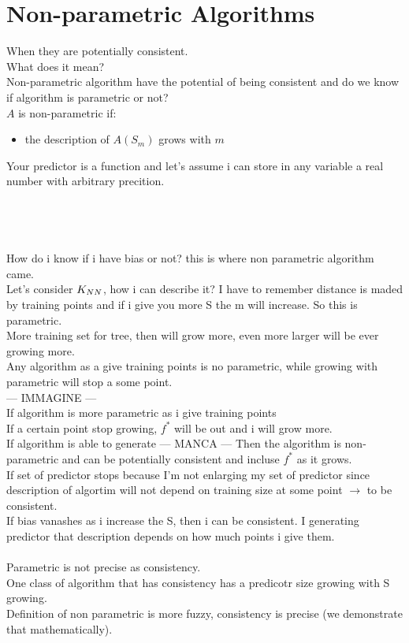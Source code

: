 \documentclass[../main.tex]{subfiles}
\begin{document}
\section{Non-parametric Algorithms}
When they are potentially consistent.
\\ What does it mean?\\
Non-parametric algorithm have the potential of being consistent and do we know if algorithm is parametric or not?
\\
$A$ is non-parametric if:
\begin{itemize}
\item the description of $A(S_m)$ grows with $m$
\end{itemize}
Your predictor is a function and let's assume i can store in any variable a real number with arbitrary precition. 
\\\\
\\\\
\\
How do i know if i have bias or not? this is where non parametric algorithm came.
\\
Let's consider $K_{NN}$, how i can describe it? I have to remember distance is maded by training points and if i give you more S the m will increase. So this is parametric. 
\\
More training set for tree, then will grow more, even more larger will be ever growing more.
\\
Any algorithm as a give training points is no parametric, while growing with parametric will stop a some point.
\\
--- IMMAGINE ---
\\
If algorithm is more parametric as i give training points\\
If a certain point stop growing, $f^*$ will be out and i will grow more.
\\
If algorithm is able to generate 
--- MANCA ---
Then the algorithm is non-parametric and can be potentially consistent and incluse $f^*$ as it grows.
\\
If set of predictor stops because I'm not enlarging my set of predictor since description of algortim will not depend on training size at some point \qquad $\rightarrow$ to be consistent.
\\
If bias vanashes as i increase the S, then i can be consistent. I generating predictor that description depends on how much points i give them.
\\\\
Parametric is not precise as consistency. 
\\
One class of algorithm that has consistency has a predicotr size growing with S growing.
\\
Definition of non parametric is more fuzzy, consistency is precise (we demonstrate that mathematically).
\\\\
\end{document}
